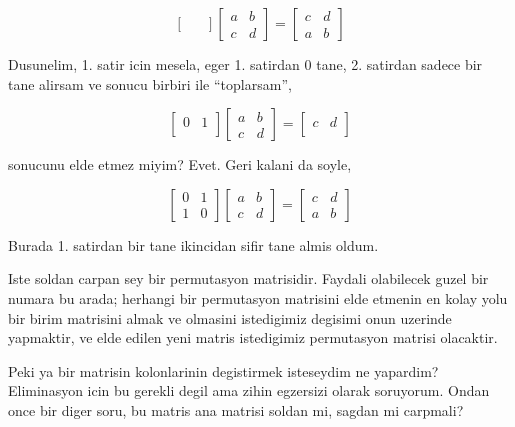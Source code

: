 \documentclass[12pt,fleqn]{article}\usepackage{../common}
\begin{document}
$$ 
\left[\begin{array}{rr}
 &  \\
 & 
\end{array}\right]
\left[\begin{array}{rr}
a & b \\
c & d
\end{array}\right]
=
\left[\begin{array}{rr}
c & d \\
a & b 
\end{array}\right]
 $$

Dusunelim, 1. satir icin mesela, eger 1. satirdan 0 tane, 2. satirdan
sadece bir tane alirsam ve sonucu birbiri ile ``toplarsam'', 

$$ 
\left[\begin{array}{rr}
0 & 1 \\
 & 
\end{array}\right]
\left[\begin{array}{rr}
a & b \\
c & d
\end{array}\right]
=
\left[\begin{array}{rr}
c & d \\
 & 
\end{array}\right]
 $$

sonucunu elde etmez miyim? Evet. Geri kalani da soyle,

$$ 
\left[\begin{array}{rr}
0 & 1 \\
1 & 0
\end{array}\right]
\left[\begin{array}{rr}
a & b \\
c & d
\end{array}\right]
=
\left[\begin{array}{rr}
c & d \\
a & b
\end{array}\right]
 $$

Burada 1. satirdan bir tane ikincidan sifir tane almis oldum.

Iste soldan carpan sey bir permutasyon matrisidir. Faydali olabilecek guzel
bir numara bu arada; herhangi bir permutasyon matrisini elde etmenin en
kolay yolu bir birim matrisini almak ve olmasini istedigimiz degisimi onun
uzerinde yapmaktir, ve elde edilen yeni matris istedigimiz permutasyon
matrisi olacaktir.

Peki ya bir matrisin kolonlarinin degistirmek isteseydim ne yapardim?
Eliminasyon icin bu gerekli degil ama zihin egzersizi olarak
soruyorum. Ondan once bir diger soru, bu matris ana matrisi soldan mi,
sagdan mi carpmali?
\end{document}
